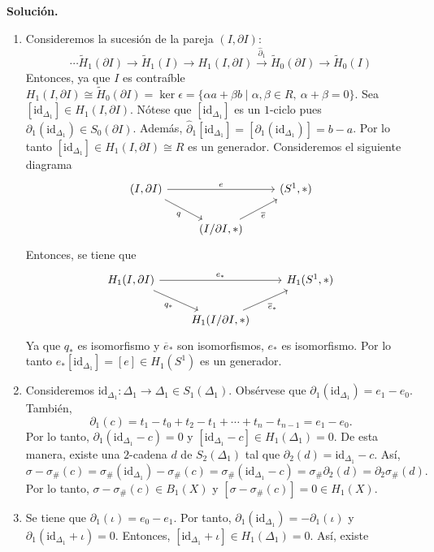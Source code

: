 \documentclass[11pt,a4paper]{article}
\theoremstyle{plain}
\theoremstyle{definition}
\theoremstyle{remark}
\begin{document}
\begin{enumerate}[label=\arabic*.,leftmargin=*]
\noindent\textbf{Solución.}
\begin{enumerate}[label=\alph*)]
\item Consideremos la sucesión de la pareja $(I,\partial I)$:
\[
\cdots\tilde H_1(\partial I)\to\tilde H_1(I)\to H_1(I,\partial I)\xrightarrow{\hat\partial_1}\tilde H_0(\partial I)\to\tilde H_0(I)
\]
Entonces, ya que $I$ es contraíble
$H_1(I,\partial I)\cong\tilde H_0(\partial I)=\ker\epsilon=\{\alpha a+\beta b\mid\alpha,\beta\in R,\ \alpha+\beta=0\}$.
Sea $[\mathrm{id}_{\Delta_1}]\in H_1(I,\partial I)$. Nótese que
$[\mathrm{id}_{\Delta_1}]$ es un $1$-ciclo pues
$\partial_1(\mathrm{id}_{\Delta_1})\in S_0(\partial I)$. Además,
$\hat\partial_1[\mathrm{id}_{\Delta_1}]=[\partial_1(\mathrm{id}_{\Delta_1})]=b-a$.
Por lo tanto $[\mathrm{id}_{\Delta_1}]\in H_1(I,\partial I)\cong R$ es un
generador. Consideremos el siguiente diagrama
\[
\begin{tikzcd}
(I,\partial I) \arrow[rr,"e"] \arrow[dr,swap,"q"] & & (S^1,*) \\
& (I/\partial I,*) \arrow[ur,swap,"\overline e"] &
\end{tikzcd}
\]
Entonces, se tiene que
\[
\begin{tikzcd}
H_1(I,\partial I) \arrow[rr,"e_*"] \arrow[dr,swap,"q_*"] & & H_1(S^1,*) \\
& H_1(I/\partial I,*) \arrow[ur,swap,"\overline e_*"] &
\end{tikzcd}
\]
Ya que $q_*$ es isomorfismo y $\overline e_*$ son isomorfismos, $e_*$ es
isomorfismo. Por lo tanto $e_*[\mathrm{id}_{\Delta_1}]=[e]\in H_1(S^1)$ es
un generador.
\item Consideremos $\mathrm{id}_{\Delta_1}:\Delta_1\to\Delta_1\in S_1(\Delta_1)$.
Obsérvese que $\partial_1(\mathrm{id}_{\Delta_1})=e_1-e_0$. También,
\[
\partial_1(c)=t_1-t_0+t_2-t_1+\cdots+t_n-t_{n-1}=e_1-e_0.
\]
Por lo tanto, $\partial_1(\mathrm{id}_{\Delta_1}-c)=0$ y
$[\mathrm{id}_{\Delta_1}-c]\in H_1(\Delta_1)=0$. De esta manera, existe una
$2$-cadena $d$ de $S_2(\Delta_1)$ tal que $\partial_2(d)=\mathrm{id}_{\Delta_1}-c$.
Así,
\[
\sigma-\sigma_\#(c)=\sigma_\#(\mathrm{id}_{\Delta_1})-\sigma_\#(c)=\sigma_\#(\mathrm{id}_{\Delta_1}-c)=\sigma_\#\partial_2(d)=\partial_2\sigma_\#(d).
\]
Por lo tanto, $\sigma-\sigma_\#(c)\in B_1(X)$ y $[\sigma-\sigma_\#(c)]=0\in H_1(X)$.
\item Se tiene que $\partial_1(\iota)=e_0-e_1$. Por tanto,
$\partial_1(\mathrm{id}_{\Delta_1})=-\partial_1(\iota)$ y
$\partial_1(\mathrm{id}_{\Delta_1}+\iota)=0$. Entonces,
$[\mathrm{id}_{\Delta_1}+\iota]\in H_1(\Delta_1)=0$. Así, existe

\end{enumerate}
\end{enumerate}
\end{document}
